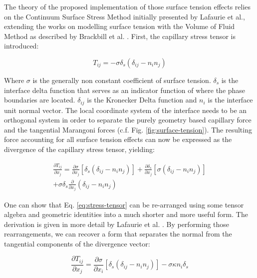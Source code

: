 \documentclass[conference,final,a4paper]{IEEEtran}
\begin{document}
The theory of the proposed implementation of those surface tension effects relies on the Continuum Surface Stress Method initially presented by Lafaurie et al., extending the works on modelling surface tension with the Volume of Fluid Method as described by Brackbill et al. \cite{lafaurieModellingMergingFragmentation1994,brackbillContinuumMethodModeling1992}.
 First, the capillary stress tensor is introduced:

\begin{equation}
    T_{ij} = - \sigma \delta_s (\delta_{ij} - n_i n_j)
\end{equation}

Where $\sigma$ is the generally non constant coefficient of surface tension. $\delta_s$ is the interface delta function that serves as an indicator function of where the phase boundaries are located. $\delta_{ij}$ is the Kronecker Delta function and $n_i$ is the interface unit normal vector. The local coordinate system of the interface needs to be an orthogonal system in order to separate the purely geometry based capillary force and the tangential Marangoni forces (c.f. Fig. \ref{fig:surface-tension}).
The resulting force accounting for all surface tension effects can now be expressed as the divergence of the capillary stress tensor, yielding:

\begin{multline} \label{eq:stress-tensor}
    \frac{\partial T_{ij}}{\partial x_j} = \frac{\partial \sigma}{\partial x_j} [\delta_s(\delta_{ij} - n_i n_j)] + \frac{\partial \delta_s}{\partial x_j} [\sigma (\delta_{ij} - n_i n_j)] \\ + \sigma \delta_s \frac{\partial}{\partial x_j} (\delta_{ij} - n_i n_j)
\end{multline}

One can show that Eq. \ref{eq:stress-tensor} can be re-arranged using some tensor algebra and geometric identities into a much shorter and more useful form. The derivation is given in more detail by Lafaurie et al. \cite{lafaurieModellingMergingFragmentation1994}. By performing those rearrangements, we can recover a form that separates the normal from the tangential components of the divergence vector:

\begin{equation}
\label{eq:divergence-capillarystress}
    \frac{\partial T_{ij}}{\partial x_j} = \frac{\partial \sigma}{\partial x_i} [\delta_s(\delta_{ij} - n_i n_j)] - \sigma \kappa n_i \delta_s 
\end{equation}
\end{document}
